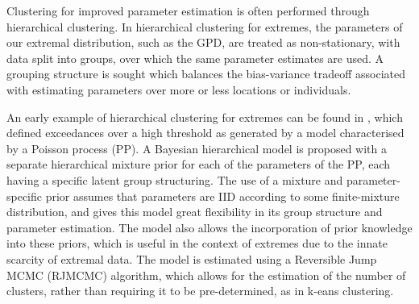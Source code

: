 \documentclass{article}
\numberwithin{equation}{section}
\begin{document}


Clustering for improved parameter estimation is often performed through hierarchical clustering.
In hierarchical clustering for extremes, the parameters of our extremal distribution, such as the GPD, are treated as non-stationary, with data split into groups, over which the same parameter estimates are used. 
A grouping structure is sought which balances the bias-variance tradeoff associated with estimating parameters over more or less locations or individuals.

An early example of hierarchical clustering for extremes can be found in \citet{Bottolo2003}, which defined exceedances over a high threshold as generated by a model characterised by a Poisson process (PP).
A Bayesian hierarchical model is proposed with a separate hierarchical mixture prior for each of the parameters of the PP, each having a specific latent group structuring.
The use of a mixture and parameter-specific prior assumes that parameters are IID according to some finite-mixture distribution, and gives this model great flexibility in its group structure and parameter estimation. 
The model also allows the incorporation of prior knowledge into these priors, which is useful in the context of extremes due to the innate scarcity of extremal data.
The model is estimated using a Reversible Jump MCMC (RJMCMC) algorithm, which allows for the estimation of the number of clusters, rather than requiring it to be pre-determined, as in k-eans clustering. 
\end{document}
